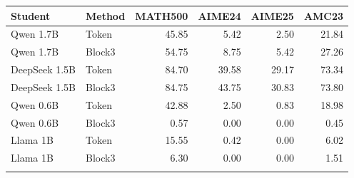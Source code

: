\begin{tabular}{@{}llrrrr@{}}
\toprule
Student & Method & MATH500 & AIME24 & AIME25 & AMC23 \\
\midrule
Qwen 1.7B & Token & 45.85 & 5.42 & 2.50 & 21.84 \\
Qwen 1.7B & Block3 & 54.75 & 8.75 & 5.42 & 27.26 \\
\addlinespace
DeepSeek 1.5B & Token & 84.70 & 39.58 & 29.17 & 73.34 \\
DeepSeek 1.5B & Block3 & 84.75 & 43.75 & 30.83 & 73.80 \\
\addlinespace
Qwen 0.6B & Token & 42.88 & 2.50 & 0.83 & 18.98 \\
Qwen 0.6B & Block3 & 0.57 & 0.00 & 0.00 & 0.45 \\
\addlinespace
Llama 1B & Token & 15.55 & 0.42 & 0.00 & 6.02 \\
Llama 1B & Block3 & 6.30 & 0.00 & 0.00 & 1.51 \\
\addlinespace
\bottomrule\end{tabular}
